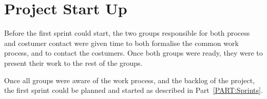 \section{Project Start Up}
Before the first sprint could start, the two groups responsible for both process and costumer contact were given time to both formalise the common work process, and to contact the costumers.
Once both groups were ready, they were to present their work to the rest of the groups.

Once all groups were aware of the work process, and the backlog of the project, the first sprint could be planned and started as described in Part~\ref{PART:Sprints}.

